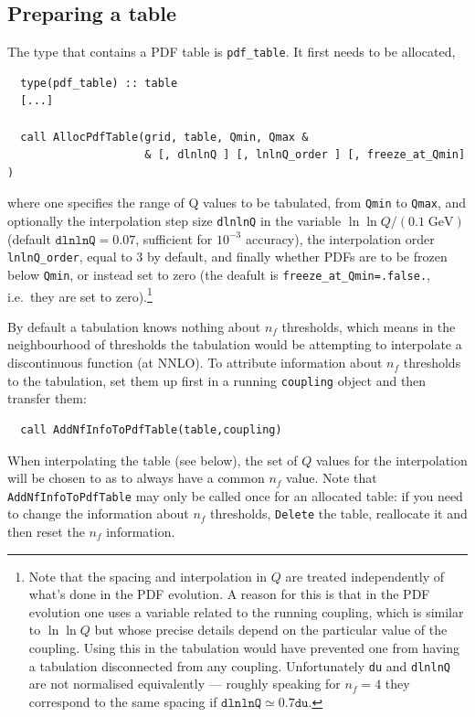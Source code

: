 \documentclass[12pt]{article}
\newcommand{\GeV}{\;\mathrm{GeV}}
\newcommand{\ie}{i.e.\ }
\newcommand{\ttt}[1]{\texttt{#1}}
\begin{document}
\subsection{Preparing a table}
The type that contains a PDF table is \ttt{pdf\_table}. It first needs
to be allocated,
\begin{verbatim}
  type(pdf_table) :: table
  [...]

  call AllocPdfTable(grid, table, Qmin, Qmax &
                     & [, dlnlnQ ] [, lnlnQ_order ] [, freeze_at_Qmin] )
\end{verbatim}
where one specifies the range of Q values to be tabulated, from
\ttt{Qmin} to \ttt{Qmax}, and optionally the interpolation step size
\ttt{dlnlnQ} in the variable $\ln \ln Q/(0.1\GeV)$ (default
$\ttt{dlnlnQ}=0.07$, sufficient for $10^{-3}$ accuracy), the
interpolation order \ttt{lnlnQ\_order}, equal to $3$ by default, and
finally whether PDFs are to be frozen below \ttt{Qmin}, or instead set
to zero (the deafult is \ttt{freeze\_at\_Qmin=.false.}, \ie they are
set to zero).\footnote{Note that the spacing and interpolation in $Q$
  are treated independently of what's done in the PDF evolution. A
  reason for this is that in the PDF evolution one uses a variable
  related to the running coupling, which is similar to $\ln \ln Q$ but
  whose precise details depend on the particular value of the
  coupling.  Using this in the tabulation would have prevented one
  from having a tabulation disconnected from any coupling.
  Unfortunately \ttt{du} and \ttt{dlnlnQ} are not normalised
  equivalently --- roughly speaking for $n_f = 4$ they correspond to
  the same spacing if $\ttt{dlnlnQ} \simeq 0.7 \ttt{du}$.}

By default a tabulation knows nothing about $n_f$ thresholds, which
means in the neighbourhood of thresholds the tabulation would be
attempting to interpolate a discontinuous function (at NNLO). To
attribute information about $n_f$ thresholds to the tabulation, set
them up first in a running \ttt{coupling} object and then transfer
them:
\begin{verbatim}
  call AddNfInfoToPdfTable(table,coupling)
\end{verbatim}
When interpolating the table (see below), the set of $Q$ values for
the interpolation will be chosen to as to always have a common $n_f$
value. Note that \ttt{AddNfInfoToPdfTable} may only be called once for
an allocated table: if you need to change the information about $n_f$
thresholds, \ttt{Delete} the table, reallocate it and then reset the
$n_f$ information.
\end{document}
